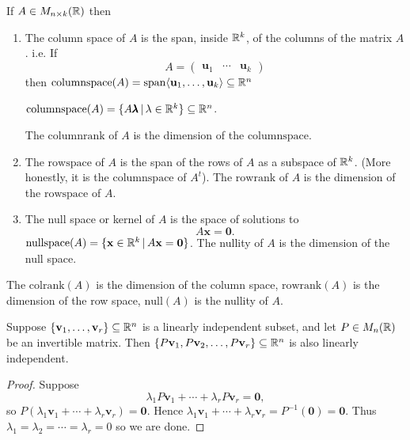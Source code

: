 \documentclass[10pt, a4paper]{article}
\newcommand{\mbf}[1]{\mathbf{#1}}
\begin{document}
\begin{definition}
    If $A \in M_{n \times k}(\mathbb{R})$ then
    \begin{enumerate}[label = (\roman*)]
        \item The column space of $A$ is the span,
        inside $\mathbb{R} ^ k$,
        of the columns of the matrix $A$.
        i.e.
        If
        \[
        A = \begin{pmatrix}
            \mbf{u}_1 & \dotsi & \mbf{u}_k
        \end{pmatrix}
        \]
        then $\mathrm{columnspace}(A) = \mathrm{span}\langle\mbf{u}_1, \dotsc, \mbf{u}_k\rangle \subseteq \R ^ n$
        
        $\mathrm{columnspace}(A) = \{A\pmb{\lambda}\,|\,\lambda \in \mathbb{R} ^ k\} \subseteq \mathbb{R} ^ n$.

        The $\mathrm{columnrank}$ of $A$ is the dimension of the $\mathrm{columnspace}$.

        \item The $\mathrm{rowspace}$ of $A$ is the span of the rows of $A$ as a subspace of $\mathbb{R} ^ k$.
        (More honestly,
        it is the $\mathrm{columnspace}$ of $A ^ t$).
        The $\mathrm{rowrank}$ of $A$ is the dimension of the $\mathrm{rowspace}$ of $A$.
        \item The null space or kernel of $A$ is the space of solutions to
        \[
        A\mbf{x} = \mbf{0}.
        \]
        $\mathrm{nullspace}(A) = \{\mbf{x} \in \R ^ k\,|\, A\mbf{x} = \mbf{0}\}$.
        The nullity of $A$ is the dimension of the null space.
    \end{enumerate}
\end{definition}

The $\mathrm{colrank}(A)$ is the dimension of the column space,
$\mathrm{rowrank}(A)$ is the dimension of the row space,
$\mathrm{null}(A)$ is the nullity of $A$.

\begin{lemma}
    Suppose $\{\mbf{v}_1, \dotsc, \mbf{v}_r\} \subseteq \R ^ n$ is a linearly independent subset,
    and let $P \in M_{n}(\mathbb{R})$ be an invertible matrix.
    Then $\{P\mbf{v}_1, P\mbf{v}_2, \dotsc, P\mbf{v}_r\} \subseteq \R ^ n$ is also linearly independent.
    \begin{proof}
        Suppose
        \[
        \lambda_1P\mbf{v}_1 + \dotsi + \lambda_rP\mbf{v}_r = \mbf{0},
        \]
        so $P(\lambda_1\mbf{v}_1 + \dotsi + \lambda_r\mbf{v}_r) = \mbf{0}$.
        Hence $\lambda_1\mbf{v}_1 + \dotsi + \lambda_r\mbf{v}_r = P ^ {-1}(\mbf{0}) = \mbf{0}$.
        Thus $\lambda_1 = \lambda_2 = \dotsi = \lambda_r = 0$ so we are done.
    \end{proof}
\end{lemma}
\end{document}
